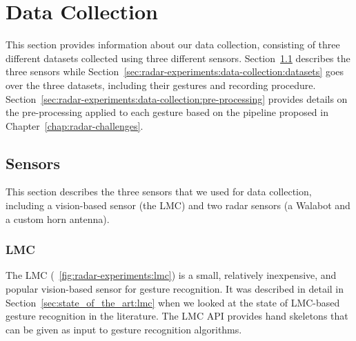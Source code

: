 \section{Data Collection} \label{sec:radar-experiments:data-collection}
This section provides information about our data collection, consisting of three different datasets collected using three different sensors. 
Section~\ref{sec:radar-experiments:data-collection:sensors} describes the three sensors while Section~\ref{sec:radar-experiments:data-collection:datasets} goes over the three datasets, including their gestures and recording procedure.
Section~\ref{sec:radar-experiments:data-collection:pre-processing} provides details on the pre-processing applied to each gesture based on the pipeline proposed in Chapter~\ref{chap:radar-challenges}.

\subsection{Sensors} \label{sec:radar-experiments:data-collection:sensors}
This section describes the three sensors that we used for data collection, including a vision-based sensor (the LMC) and two radar sensors (a Walabot and a custom horn antenna).

\subsubsection{LMC}
The LMC (\fig~\ref{fig:radar-experiments:lmc}) is a small, relatively inexpensive, and popular vision-based sensor for gesture recognition. It was described in detail in Section~\ref{sec:state_of_the_art:lmc} when we looked at the state of LMC-based gesture recognition in the literature. The LMC API provides hand skeletons that can be given as input to gesture recognition algorithms.

